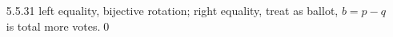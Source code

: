 \documentclass[paper=a4, fontsize=11pt]{scrartcl} %
\numberwithin{equation}{section} %
\numberwithin{figure}{section} %
\numberwithin{table}{section} %
\def \var {\text{Var}}
\begin{document}
\begin{itemize}
\begin{itemize}
		\begin{align}
			E[h] &= E[\frac{(x-y)^2}{2}]\\
				&= E[t^2-(E[t])^2]\\
				&= \var(\xi)= \sigma^2
		\end{align}
		and recall Hewitt-Savage 0-1 law, thus $W_{-n}\stackrel{a.s.}{\rightarrow} \sigma^2$.\qed
		\item[(b)] check formal solution (however, since $W_n$ converge, easily get $E[W_{-n}^2]\rightarrow E[W_{-\infty}]^2=(E[h])^2$)
	\end{itemize}
	\item[5.5.31] left equality, bijective rotation; right equality, treat as ballot, $b=p-q$ is total more votes.\qed
\end{itemize}
\end{document}
